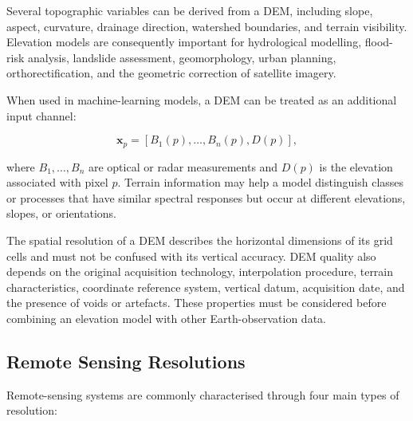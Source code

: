 \documentclass[11pt,a4paper]{article}
\begin{document}
Several topographic variables can be derived from a DEM, including
slope, aspect, curvature, drainage direction, watershed boundaries, and
terrain visibility. Elevation models are consequently important for
hydrological modelling, flood-risk analysis, landslide assessment,
geomorphology, urban planning, orthorectification, and the geometric
correction of satellite imagery.

When used in machine-learning models, a DEM can be treated as an
additional input channel:

\[
\mathbf{x}_p =
\left[
B_1(p),\ldots,B_n(p),D(p)
\right],
\]

where \(B_1,\ldots,B_n\) are optical or radar measurements and \(D(p)\)
is the elevation associated with pixel \(p\). Terrain information may
help a model distinguish classes or processes that have similar
spectral responses but occur at different elevations, slopes, or
orientations.

The spatial resolution of a DEM describes the horizontal dimensions of
its grid cells and must not be confused with its vertical accuracy.
DEM quality also depends on the original acquisition technology,
interpolation procedure, terrain characteristics, coordinate reference
system, vertical datum, acquisition date, and the presence of voids or
artefacts. These properties must be considered before combining an
elevation model with other Earth-observation data.

\subsection{Remote Sensing Resolutions}

Remote-sensing systems are commonly characterised through four main
types of resolution:
\end{document}
